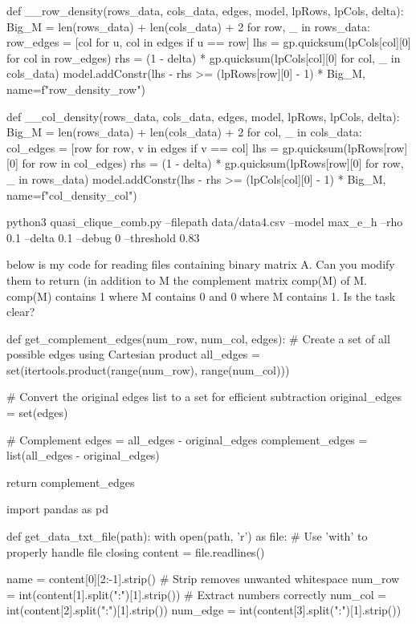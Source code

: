 def __row_density(rows_data, cols_data, edges, model, lpRows, lpCols, delta):
    Big_M = len(rows_data) + len(cols_data) + 2
    for row, _ in rows_data:
        row_edges = [col for u, col in edges if u == row]
        lhs = gp.quicksum(lpCols[col][0] for col in row_edges)
        rhs = (1 - delta) * gp.quicksum(lpCols[col][0] for col, _ in cols_data)
        model.addConstr(lhs - rhs >= (lpRows[row][0] - 1) * Big_M, name=f"row_density_{row}")

def __col_density(rows_data, cols_data, edges, model, lpRows, lpCols, delta):
    Big_M = len(rows_data) + len(cols_data) + 2
    for col, _ in cols_data:
        col_edges = [row for row, v in edges if v == col]
        lhs = gp.quicksum(lpRows[row][0] for row in col_edges)
        rhs = (1 - delta) * gp.quicksum(lpRows[row][0] for row, _ in rows_data)
        model.addConstr(lhs - rhs >= (lpCols[col][0] - 1) * Big_M, name=f"col_density_{col}")
        
        
         python3 quasi_clique_comb.py --filepath data/data4.csv   --model  max_e_h  --rho 0.1  --delta 0.1 --debug 0  --threshold 0.83
         
 below is my code for reading  files containing binary   matrix A.  Can you modify them to return (in addition to M  the complement matrix comp(M)  of M.  comp(M) contains 1 where M contains 0  and 0 where M contains 1. Is the task clear?
         
         
         
def get_complement_edges(num_row, num_col, edges):
    # Create a set of all possible edges using Cartesian product
    all_edges = set(itertools.product(range(num_row), range(num_col)))

    # Convert the original edges list to a set for efficient subtraction
    original_edges = set(edges)

    # Complement edges = all_edges - original_edges
    complement_edges = list(all_edges - original_edges)

    return complement_edges

import pandas as pd

def get_data_txt_file(path):
    with open(path, 'r') as file:  # Use 'with' to properly handle file closing
        content = file.readlines()
    
    name = content[0][2:-1].strip()  # Strip removes unwanted whitespace
    num_row = int(content[1].split(":")[1].strip())  # Extract numbers correctly
    num_col = int(content[2].split(":")[1].strip())
    num_edge = int(content[3].split(":")[1].strip())

